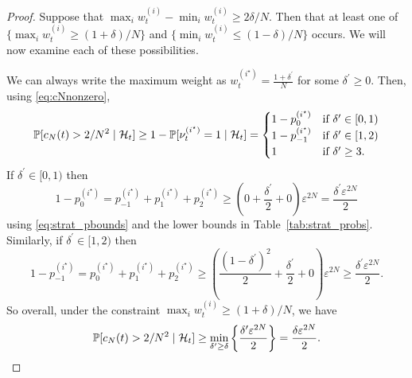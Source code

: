 \begin{proof}
Suppose that $\max_i w_t^{(i)} - \min_i w_t^{(i)} \geq 2\delta/N$. Then that at least one of $\{ \max_i w_t^{(i)} \geq (1+\delta)/N \}$ and $\{ \min_i w_t^{(i)} \leq (1-\delta)/N \}$ occurs. We will now examine each of these possibilities.

We can always write the maximum weight as $w_t^{(i^\star)} = \frac{1+\delta^\prime}{N}$ for some $\delta^\prime \geq 0$. Then, using \eqref{eq:cNnonzero},
\begin{equation*}
\mathbb{P}[ c_N(t) > 2/N^2 \mid \mathcal{H}_t ]
\geq 1- \mathbb{P}[ \nu_t^{(i^\star)} =1 \mid \mathcal{H}_t ]
= \begin{cases}
    1 - p_0^{(i^\star)} & \text{if } \delta^\prime \in [0,1) \\
    1 - p_{-1}^{(i^\star)} & \text{if } \delta^\prime \in [1,2) \\
    1 & \text{if } \delta^\prime \geq 3 .
\end{cases}
\end{equation*}
If $\delta^\prime \in [0,1)$ then
\begin{equation*}
1 - p_0^{(i^\star)}
= p_{-1}^{(i^\star)} + p_1^{(i^\star)} + p_2^{(i^\star)}
\geq \left( 0 + \frac{\delta^\prime}{2} + 0 \right) \varepsilon^{2N} 
= \frac{\delta^\prime \varepsilon^{2N} }{2}
\end{equation*}
using \eqref{eq:strat_pbounds} and the lower bounds in Table~\ref{tab:strat_probs}.
Similarly, if $\delta^\prime \in [1,2)$ then
\begin{equation*}
1 - p_{-1}^{(i^\star)}
= p_0^{(i^\star)} + p_1^{(i^\star)} + p_2^{(i^\star)}
\geq \left( \frac{(1-\delta^\prime)^2}{2} + \frac{\delta^\prime}{2} + 0 \right)
        \varepsilon^{2N} 
\geq \frac{\delta^\prime \varepsilon^{2N} }{2} .
\end{equation*}
So overall, under the constraint $\max_i w_t^{(i)} \geq (1+\delta)/N$, we have
\begin{equation*}
\mathbb{P}[ c_N(t) > 2/N^2 \mid \mathcal{H}_t ]
\geq \min_{\delta^\prime \geq \delta} 
        \left\{ \frac{\delta^\prime \varepsilon^{2N} }{2} \right\}
= \frac{ \delta \varepsilon^{2N} }{2} .
\end{equation*}


\end{proof}
